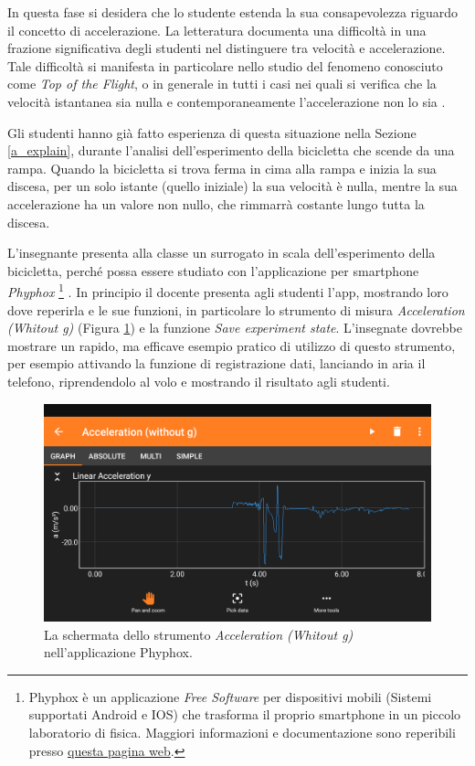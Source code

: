 \documentclass{report} \usepackage[T1]{fontenc} \usepackage[italian]{babel}
\begin{document}
In questa fase si desidera che lo studente estenda la sua consapevolezza
riguardo il concetto di accelerazione. La letteratura documenta una difficoltà
in una frazione significativa degli studenti nel distinguere tra velocità
e accelerazione. Tale difficoltà si manifesta in particolare nello studio
del fenomeno conosciuto come \emph{Top of the Flight}, o in generale
in tutti i casi nei quali si verifica che la velocità istantanea sia nulla
e contemporaneamente l'accelerazione non lo sia\cite{arons1997teaching}
\cite{trowbridge1981investigation}.

Gli studenti hanno già fatto esperienza di questa situazione nella Sezione
\ref{a_explain}, durante l'analisi dell'esperimento della bicicletta che
scende da una rampa. Quando la bicicletta si trova ferma in cima alla rampa
e inizia la sua discesa, per un solo istante (quello iniziale) la sua velocità
è nulla, mentre la sua accelerazione ha un valore non nullo, che rimmarrà costante
lungo tutta la discesa.

L'insegnante presenta alla classe un surrogato in scala dell'esperimento della
bicicletta, perché possa essere studiato con l'applicazione per smartphone
\emph{Phyphox}
\footnote{
          Phyphox è un applicazione \emph{Free Software} per dispositivi mobili
          (Sistemi supportati Android e IOS) che trasforma il proprio
          smartphone in un piccolo laboratorio di fisica. Maggiori
          informazioni e documentazione sono reperibili presso
          \href{https://phyphox.org/}{questa pagina web}.
         }
. In principio il docente presenta agli studenti l'app, mostrando loro dove
reperirla e le sue funzioni, in particolare lo strumento di misura
\emph{Acceleration (Whitout g)} (Figura \ref{fig:phyphox}) e la funzione
\emph{Save experiment state}.
L'insegnate dovrebbe mostrare un rapido, ma efficave esempio pratico
di utilizzo di questo strumento, per esempio attivando la funzione
di registrazione dati, lanciando in aria il telefono, riprendendolo
al volo e mostrando il risultato agli studenti.

\begin{figure}[H]
\centering
  \includegraphics[width=\textwidth]{phyphox}
  \caption{La schermata dello strumento \emph{Acceleration (Whitout g)}
           nell'applicazione Phyphox.}
  \label{fig:phyphox}
\end{figure}
\end{document}
